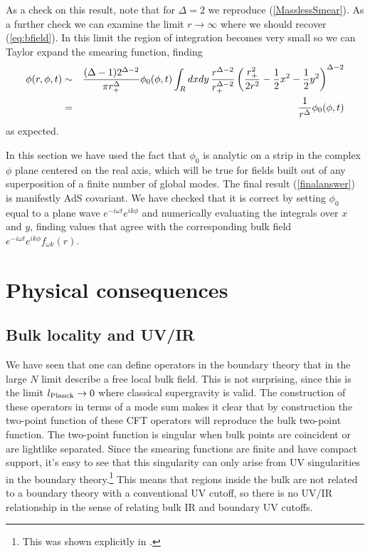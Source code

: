 \documentclass[12pt]{article}
\newcommand{\bea}{\begin{eqnarray}}
\newcommand{\eea}{\end{eqnarray}}
\begin{document}
As a check on this result, note that for $\Delta = 2$ we reproduce
(\ref{MasslessSmear}).  As a further check we can examine the limit $r
\to \infty$ where we should recover (\ref{eq:bfield}). In this limit
the region of integration becomes very small so we can Taylor expand
the smearing function, finding
%
\bea
\nonumber
\phi(r,\phi,t) & \sim & {(\Delta - 1) 2^{\Delta - 2} \over \pi r_+^\Delta} \phi_0(\phi,t)
\int_R dx dy \, {r^{\Delta - 2} \over r_+^{\Delta - 2}} \left({r_+^2 \over 2 r^2} - {1 \over 2} x^2 - {1 \over 2} y^2
\right)^{\Delta - 2} \\
& = & {1 \over r^\Delta} \phi_0(\phi,t)
\eea
%
as expected.

In this section we have used the fact that $\phi_0$ is analytic on a
strip in the complex $\phi$ plane centered on the real axis, which
will be true for fields built out of any superposition of a finite
number of global modes. The final result (\ref{finalanswer}) is
manifestly AdS covariant. We have checked that it is correct by
setting $\phi_0$ equal to a plane wave $e^{-i \omega t} e^{i k \phi}$
and numerically evaluating the integrals over $x$ and $y$, finding
values that agree with the corresponding bulk field $e^{-i \omega t}
e^{i k \phi} f_{\omega k}(r)$.

\section{Physical consequences} \label{physics}

\subsection{Bulk locality and UV/IR}

We have seen that one can define operators in the boundary theory that
in the large $N$ limit describe a free local bulk field. This is not
surprising, since this is the limit $l_{\rm Planck} \rightarrow 0$ where
classical supergravity is valid. The
construction of these operators in terms of a mode sum makes it
clear that by construction the two-point function of these CFT operators
will reproduce the bulk two-point function.
The two-point function is singular when bulk points are
coincident or are lightlike separated.  Since the smearing
functions are finite and have compact support, it's easy to see that
this singularity can only arise from UV singularities in the boundary
theory.\footnote{This was shown explicitly in \cite{hkll}.} This means that regions
inside the bulk are not related to a boundary theory with a conventional UV cutoff, so
there is no UV/IR relationship in the sense of relating bulk IR and
boundary UV cutoffs.  
\end{document}
